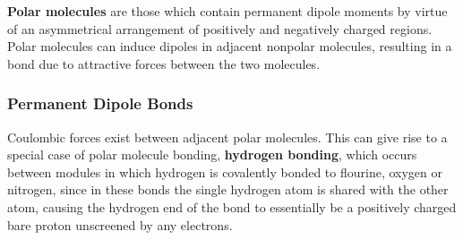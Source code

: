 \documentclass{article}
\begin{document}
\textbf{Polar molecules} are those which contain permanent dipole moments by virtue of an asymmetrical arrangement of positively and negatively charged regions. Polar molecules can induce dipoles in adjacent nonpolar molecules, resulting in a bond due to attractive forces between the two molecules. 

\subsubsection{Permanent Dipole Bonds}

Coulombic forces exist between adjacent polar molecules. This can give rise to a special case of polar molecule bonding, \textbf{hydrogen bonding}, which occurs between modules in which hydrogen is covalently bonded to flourine, oxygen or nitrogen, since in these bonds the single hydrogen atom is shared with the other atom, causing the hydrogen end of the bond to essentially be a positively charged bare proton unscreened by any electrons.
\end{document}
